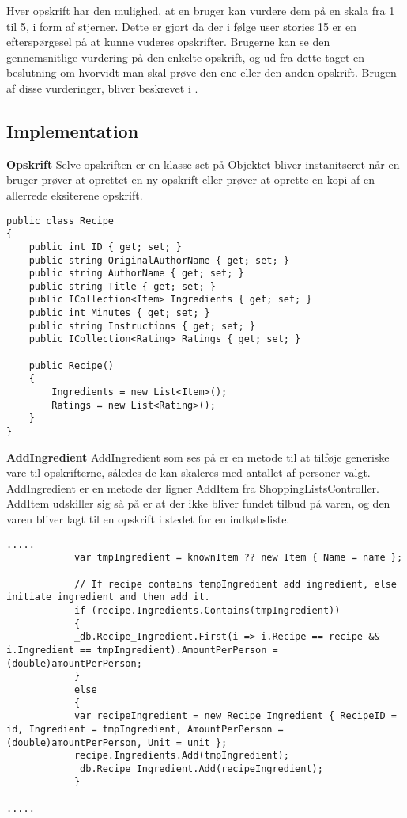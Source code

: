 Hver opskrift har den mulighed, at en bruger kan vurdere dem på en skala fra 1 til 5, i form af stjerner. Dette er gjort da der i følge user stories 15 er en efterspørgesel på at kunne vuderes opskrifter.
Brugerne kan se den gennemsnitlige vurdering på den enkelte opskrift, og ud fra dette taget en beslutning om hvorvidt man skal prøve den ene eller den anden opskrift.
Brugen af disse vurderinger, bliver beskrevet i .


\subsection{Implementation}
\textbf{Opskrift}
Selve opskriften er en klasse set på  Objektet bliver instanitseret når en bruger prøver at oprettet en ny opskrift eller prøver at oprette en kopi af en allerrede eksiterene opskrift.


\begin{lstlisting}[caption="Klassen Recipe som svarer til objektet\, opskrift"]
public class Recipe
{
    public int ID { get; set; }
    public string OriginalAuthorName { get; set; }
    public string AuthorName { get; set; }
    public string Title { get; set; }
    public ICollection<Item> Ingredients { get; set; }
    public int Minutes { get; set; }
    public string Instructions { get; set; }
    public ICollection<Rating> Ratings { get; set; }

    public Recipe()
    {
        Ingredients = new List<Item>();
        Ratings = new List<Rating>();
    }
}
\end{lstlisting}

\textbf{AddIngredient}
AddIngredient som ses på  er en metode til at tilføje generiske vare til opskrifterne, således de kan skaleres med antallet af personer valgt. AddIngredient er en metode der ligner AddItem fra ShoppingListsController. AddItem udskiller sig så på er at der ikke bliver fundet tilbud på varen, og den varen bliver lagt til en opskrift i stedet for en indkøbsliste.


\begin{lstlisting}[caption="Udklip fra AddIngredient som opretter og tilføjer ingredienser til en specifik opskrift - Her er vist hvad der er forskel fra AddItem i ShoppingListsController"]
.....
            var tmpIngredient = knownItem ?? new Item { Name = name };
            
            // If recipe contains tempIngredient add ingredient, else initiate ingredient and then add it.
            if (recipe.Ingredients.Contains(tmpIngredient))
            {
            _db.Recipe_Ingredient.First(i => i.Recipe == recipe && i.Ingredient == tmpIngredient).AmountPerPerson = (double)amountPerPerson;
            }
            else
            {
            var recipeIngredient = new Recipe_Ingredient { RecipeID = id, Ingredient = tmpIngredient, AmountPerPerson = (double)amountPerPerson, Unit = unit };
            recipe.Ingredients.Add(tmpIngredient);
            _db.Recipe_Ingredient.Add(recipeIngredient);
            }
            
.....
\end{lstlisting}


